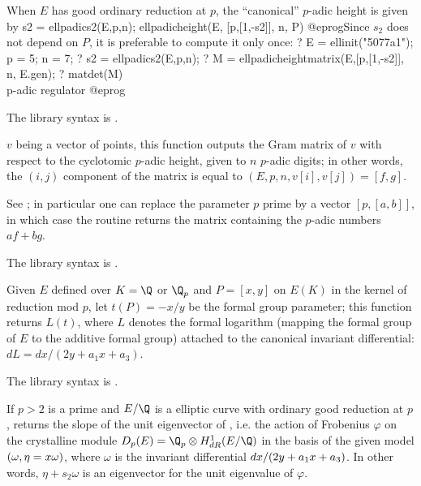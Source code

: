 When $E$ has good ordinary reduction at $p$, the ``canonical''
$p$-adic height is given by
\bprog
s2 = ellpadics2(E,p,n);
ellpadicheight(E, [p,[1,-s2]], n, P)
@eprog\noindent Since $s_2$ does not depend on $P$, it is preferable to
compute it only once:
\bprog
? E = ellinit("5077a1"); p = 5; n = 7;
? s2 = ellpadics2(E,p,n);
? M = ellpadicheightmatrix(E,[p,[1,-s2]], n, E.gen);
? matdet(M)   \\ p-adic regulator
@eprog

The library syntax is .

\label{se:ellpadicheightmatrix}
$v$ being a vector of points, this function outputs the Gram matrix of
$v$ with respect to the cyclotomic $p$-adic height, given to $n$ $p$-adic
digits; in other words, the $(i,j)$ component of the matrix is equal to
$(E,p,n, v[i],v[j]) = [f,g]$.

See ; in particular one can replace the parameter $p$
prime by a vector $[p,[a,b]]$, in which case the routine returns the matrix
containing the $p$-adic numbers $af + bg$.

The library syntax is .

\label{se:ellpadiclog}
Given $E$ defined over $K = \Q$ or $\Q_p$ and $P = [x,y]$ on $E(K)$ in the
kernel of reduction mod $p$, let $t(P) = -x/y$ be the formal group
parameter; this function returns $L(t)$, where $L$ denotes the formal
logarithm (mapping  the formal group of $E$  to the additive formal group)
attached to the canonical invariant differential:
$dL = dx/(2y + a_1x + a_3)$.

The library syntax is .

\label{se:ellpadics2}
If $p>2$ is a prime and $E/\Q$ is a elliptic curve with ordinary good
reduction at $p$, returns the slope of the unit eigenvector
of , i.e. the action of Frobenius $\varphi$ on
the crystalline module $D_p(E)= \Q_p \otimes H^1_{dR}(E/\Q)$ in the basis of
the given model $(\omega, \eta=x\*\omega)$, where $\omega$ is the invariant
differential $dx/(2\*y+a_1\*x+a_3)$. In other words, $\eta + s_2\omega$
is an eigenvector for the unit eigenvalue of $\varphi$.

